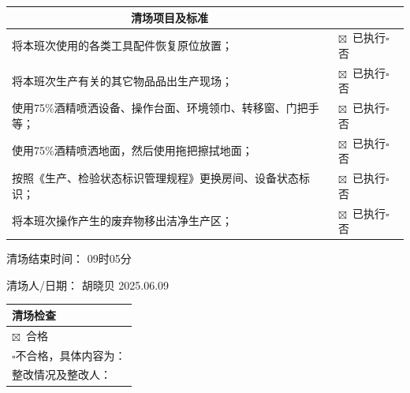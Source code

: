\documentclass[UTF8,10pt,a4paper,fontset=fandol]{ctexart}
\newcommand{\fieldvalue}[1]{#1}
\newcommand{\handwritten}[1]{#1}
\begin{document}
\small
\begin{tabularx}{\textwidth}{|X|>{\centering\arraybackslash}p{}|}
\hline
\multicolumn{1}{|c|}{清场项目及标准} & \multicolumn{1}{c|}{执行情况} \\
\hline
将本班次使用的各类工具配件恢复原位放置； &
\fieldvalue{\ensuremath{\boxtimes}\ 已执行\quad $\square$否} \\
\hline
将本班次生产有关的其它物品品出生产现场； &
\fieldvalue{\ensuremath{\boxtimes}\ 已执行\quad $\square$否} \\
\hline
使用75\%酒精喷洒设备、操作台面、环境领巾、转移窗、门把手等； &
\fieldvalue{\ensuremath{\boxtimes}\ 已执行\quad $\square$否} \\
\hline
使用75\%酒精喷洒地面，然后使用拖把擦拭地面； &
\fieldvalue{\ensuremath{\boxtimes}\ 已执行\quad $\square$否} \\
\hline
按照《生产、检验状态标识管理规程》更换房间、设备状态标识； &
\fieldvalue{\ensuremath{\boxtimes}\ 已执行\quad $\square$否} \\
\hline
将本班次操作产生的废弃物移出洁净生产区； &
\fieldvalue{\ensuremath{\boxtimes}\ 已执行\quad $\square$否} \\
\hline
\end{tabularx}
\normalsize

\medskip
\noindent
清场结束时间：
\fieldvalue{\handwritten{09时05分}}

\medskip
\noindent
清场人/日期：
\fieldvalue{\handwritten{胡晓贝}}
\hspace{1cm}
\fieldvalue{\handwritten{2025.06.09}}

\medskip

\begin{tabularx}{\textwidth}{|X|}
\hline
清场检查 \\
\hline
\fieldvalue{\ensuremath{\boxtimes}\ 合格} \\
\hline
$\square$不合格，具体内容为： \\
\hline
\hspace{1cm}整改情况及整改人： \\
\hline
\end{tabularx}
\end{document}
